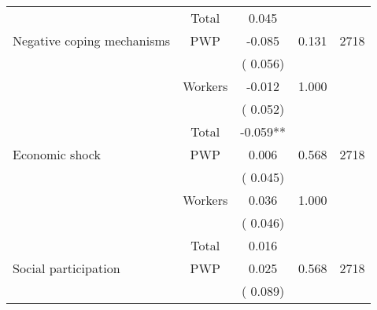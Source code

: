 \begin{tabular}{l*{4}{c}}
\cmidrule{2-3}
                               &       Total           &              0.045               &   &                                               \\ 
\cmidrule{2-3}
 Negative coping mechanisms                &       PWP     &             -0.085               &        0.131   & 2718                              \\ 
                               &                               &       (       0.056)                     & &                                                                             \\ 
                               &       Workers         &             -0.012               &        1.000   &                                               \\ 
                               &                               &       (       0.052)                     & &                                                                             \\ 
\cmidrule{2-3}
                               &       Total           &             -0.059**               &   &                                               \\ 
\cmidrule{2-3}
 Economic shock                &       PWP     &              0.006               &        0.568   & 2718                              \\ 
                               &                               &       (       0.045)                     & &                                                                             \\ 
                               &       Workers         &              0.036               &        1.000   &                                               \\ 
                               &                               &       (       0.046)                     & &                                                                             \\ 
\cmidrule{2-3}
                               &       Total           &              0.016               &   &                                               \\ 
\cmidrule{2-3}
 Social participation                &       PWP     &              0.025               &        0.568   & 2718                              \\ 
                               &                               &       (       0.089)                     & &                                                                             \\ 

\end{tabular}
